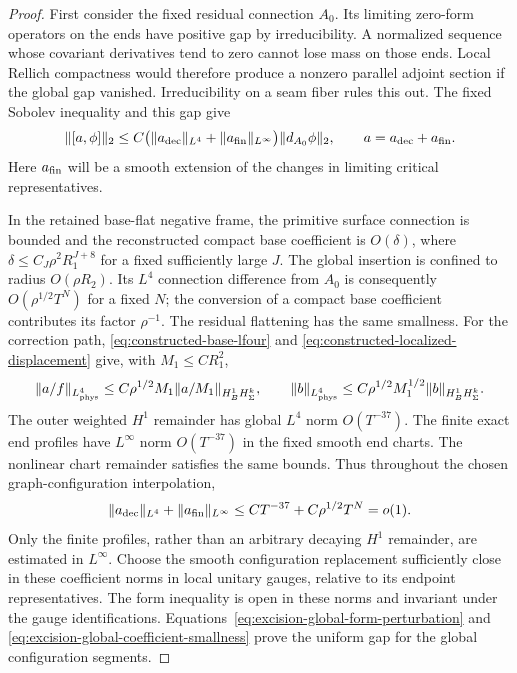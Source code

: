 \documentclass[11pt]{amsart}
\theoremstyle{definition}
\theoremstyle{remark}
\theoremstyle{plain}
\begin{document}
\begin{proof}
First consider the fixed residual connection $A_0$.
Its limiting zero-form operators on the ends have positive
gap by irreducibility. A normalized sequence whose covariant
derivatives tend to zero cannot lose mass on those ends.
Local Rellich compactness would therefore produce a nonzero
parallel adjoint section if the global gap vanished.
Irreducibility on a seam fiber rules this out.
The fixed Sobolev inequality and this gap give
\begin{equation}\label{eq:excision-global-form-perturbation}
 \|[a,\phi]\|_2
 \leq C\bigl(\|a_{\rm dec}\|_{L^4}
                  +\|a_{\rm fin}\|_{L^\infty}\bigr)
                                   \|d_{A_0}\phi\|_2,
 \qquad a=a_{\rm dec}+a_{\rm fin}.
\end{equation}
Here $a_{\rm fin}$ will be a smooth extension of the changes
in limiting critical representatives.

In the retained base-flat negative frame, the primitive surface
connection is bounded and the reconstructed compact base
coefficient is $O(\delta)$, where
$\delta\leq C_J\rho^2R_1^{J+8}$ for a fixed sufficiently large $J$.
The global insertion is confined to radius $O(\rho R_2)$.
Its $L^4$ connection difference from $A_0$ is consequently
$O(\rho^{1/2}T^N)$ for a fixed $N$; the conversion of a compact
base coefficient contributes its factor $\rho^{-1}$.
The residual flattening has the same smallness.
For the correction path,
\eqref{eq:constructed-base-lfour} and
\eqref{eq:constructed-localized-displacement} give, with
$M_1\leq CR_1^2$,
\[
 \|a/f\|_{L^4_{\rm phys}}
       \leq C\rho^{1/2}M_1\|a/M_1\|_{H^1_BH^k_\Sigma},
 \qquad
 \|b\|_{L^4_{\rm phys}}
       \leq C\rho^{1/2}M_1^{1/2}\|b\|_{H^1_BH^k_\Sigma}.
\]
The outer weighted $H^1$ remainder has global $L^4$ norm
$O(T^{-37})$. The finite exact end profiles have $L^\infty$
norm $O(T^{-37})$ in the fixed smooth end charts.
The nonlinear chart remainder satisfies the same bounds.
Thus throughout the chosen graph-configuration interpolation,
\begin{equation}\label{eq:excision-global-coefficient-smallness}
 \|a_{\rm dec}\|_{L^4}+\|a_{\rm fin}\|_{L^\infty}
                       \leq CT^{-37}+C\rho^{1/2}T^N=o(1).
\end{equation}
Only the finite profiles, rather than an arbitrary decaying
$H^1$ remainder, are estimated in $L^\infty$.
Choose the smooth configuration replacement sufficiently close
in these coefficient norms in local unitary gauges, relative
to its endpoint representatives. The form inequality is open
in these norms and invariant under the gauge identifications.
Equations~\eqref{eq:excision-global-form-perturbation} and
\eqref{eq:excision-global-coefficient-smallness} prove the
uniform gap for the global configuration segments.


\end{proof}
\end{document}
